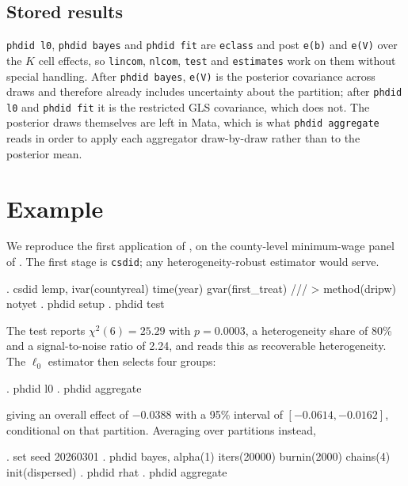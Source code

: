 \documentclass{sj}
\begin{document}
\subsection{Stored results}

\texttt{phdid l0}, \texttt{phdid bayes} and \texttt{phdid fit} are
\texttt{eclass} and post \texttt{e(b)} and \texttt{e(V)} over the $K$ cell
effects, so \texttt{lincom}, \texttt{nlcom}, \texttt{test} and
\texttt{estimates} work on them without special handling.  After
\texttt{phdid bayes}, \texttt{e(V)} is the posterior covariance across draws
and therefore already includes uncertainty about the partition; after
\texttt{phdid l0} and \texttt{phdid fit} it is the restricted GLS covariance,
which does not.  The posterior draws themselves are left in Mata, which is
what \texttt{phdid aggregate} reads in order to apply each aggregator
draw-by-draw rather than to the posterior mean.

\section{Example}
\label{sec:example}

We reproduce the first application of \citet{AroraWagle2026}, on the
county-level minimum-wage panel of \citet{CallawaySantAnna2021}.  The first
stage is \texttt{csdid}; any heterogeneity-robust estimator would serve.

\begin{stlog}
. csdid lemp, ivar(countyreal) time(year) gvar(first_treat) ///
>     method(dripw) notyet
. phdid setup
. phdid test
\end{stlog}

The test reports $\chi^2(6) = 25.29$ with $p = 0.0003$, a heterogeneity share
of 80\% and a signal-to-noise ratio of 2.24, and reads this as recoverable
heterogeneity.  The $\ell_0$ estimator then selects four groups:

\begin{stlog}
. phdid l0
. phdid aggregate
\end{stlog}

giving an overall effect of $-0.0388$ with a 95\% interval of $[-0.0614,
-0.0162]$, conditional on that partition.  Averaging over partitions instead,

\begin{stlog}
. set seed 20260301
. phdid bayes, alpha(1) iters(20000) burnin(2000) chains(4) init(dispersed)
. phdid rhat
. phdid aggregate
\end{stlog}
\end{document}
